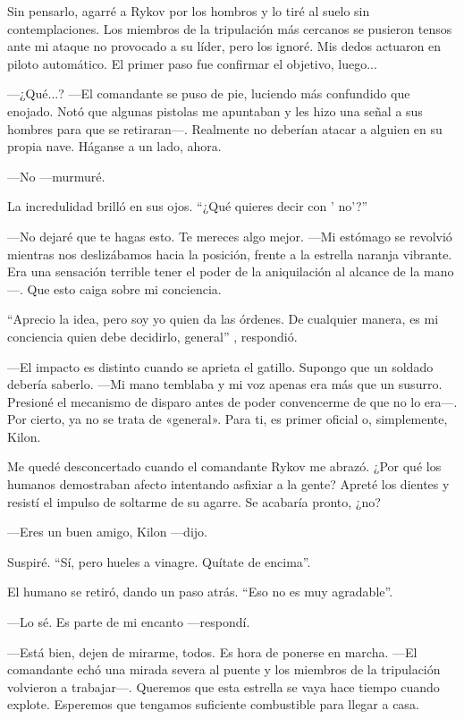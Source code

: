 Sin pensarlo, agarré a Rykov por los hombros y lo tiré al suelo sin contemplaciones. Los miembros de la tripulación más cercanos se pusieron tensos ante mi ataque no provocado a su líder, pero los ignoré. Mis dedos actuaron en piloto automático. El primer paso fue confirmar el objetivo, luego...

—¿Qué...? —El comandante se puso de pie, luciendo más confundido que enojado. Notó que algunas pistolas me apuntaban y les hizo una señal a sus hombres para que se retiraran—. Realmente no deberían atacar a alguien en su propia nave. Háganse a un lado, ahora.

—No —murmuré.

La incredulidad brilló en sus ojos. ``¿Qué quieres decir con ' no'?''


—No dejaré que te hagas esto. Te mereces algo mejor. —Mi estómago se revolvió mientras nos deslizábamos hacia la posición, frente a la estrella naranja vibrante. Era una sensación terrible tener el poder de la aniquilación al alcance de la mano—. Que esto caiga sobre mi conciencia.

``Aprecio la idea, pero soy yo quien da las órdenes. De cualquier manera, es mi conciencia quien debe decidirlo, general''
, respondió.

—El impacto es distinto cuando se aprieta el gatillo. Supongo que un soldado debería saberlo. —Mi mano temblaba y mi voz apenas era más que un susurro. Presioné el mecanismo de disparo antes de poder convencerme de que no lo era—. Por cierto, ya no se trata de «general». Para ti, es primer oficial o, simplemente, Kilon.

Me quedé desconcertado cuando el comandante Rykov me abrazó. ¿Por qué los humanos demostraban afecto intentando asfixiar a la gente? Apreté los dientes y resistí el impulso de soltarme de su agarre. Se acabaría pronto, ¿no?

—Eres un buen amigo, Kilon —dijo.

Suspiré. ``Sí, pero hueles a vinagre. Quítate de encima''.

El humano se retiró, dando un paso atrás. ``Eso no es muy agradable''.

—Lo sé. Es parte de mi encanto —respondí.

—Está bien, dejen de mirarme, todos. Es hora de ponerse en marcha. —El comandante echó una mirada severa al puente y los miembros de la tripulación volvieron a trabajar—. Queremos que esta estrella se vaya hace tiempo cuando explote. Esperemos que tengamos suficiente combustible para llegar a casa.

